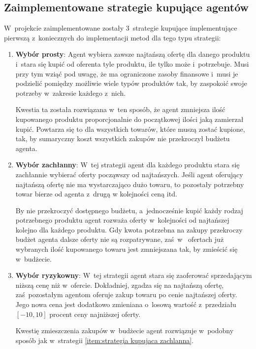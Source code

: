 \documentclass[12pt]{article}
\makeatletter
\def\namedlabel#1#2{\begingroup
   \def\@currentlabel{#2}%
   \label{#1}\endgroup
}
\makeatother
\begin{document}
\subsection{Zaimplementowane strategie kupujące agentów}
W~projekcie zaimplementowane zostały 3~strategie kupujące implementujące pierwszą z~koniecznych do implementacji metod dla tego typu strategii:
\begin{enumerate}
 \item \namedlabel{item:strategia kupujaca prosta}{Wybór prosty} \textbf{Wybór prosty}: Agent wybiera zawsze najtańszą ofertę dla danego produktu i~stara się kupić od oferenta tyle produktu, ile tylko może i~potrzebuje.
Musi przy tym wziąć pod uwagę, że ma ograniczone zasoby finansowe i~musi je podzielić pomiędzy możliwie wiele typów produktów tak, by zaspokoić swoje potrzeby w~zakresie każdego z~nich.

Kwestia ta została rozwiązana w~ten sposób, że agent zmniejsza ilość kupowanego produktu proporcjonalnie do początkowej ilości jaką zamierzał kupić.
Powtarza się to dla wszystkich towarów, które muszą zostać kupione, tak, by sumaryczny koszt wszystkich zakupów nie przekroczył budżetu agenta.
 \item \namedlabel{item:strategia kupujaca zachlanna}{Wybór zachłanny} \textbf{Wybór zachłanny}: W~tej strategii agent dla każdego produktu stara się zachłannie wybierać oferty począwszy od najtańszych. 
Jeśli agent oferujący najtańszą ofertę nie ma wystarczająco dużo towaru, to pozostały potrzebny towar bierze od agenta z~drugą w kolejności ceną itd.

By nie przekroczyć dostępnego budżetu, a~jednocześnie kupić każdy rodzaj potrzebnego produktu agent rozważa oferty w~kolejności od najtańszej kolejno dla każdego produktu. Gdy kwota potrzebna na zakupy
przekroczy budżet agenta dalsze oferty nie są rozpatrywane, zaś~w~ ofertach już wybranych ilość kupowanego towaru jest zmniejszana tak, by zmieścić się w~budżecie.
 
 \item \namedlabel{item:strategia kupujaca ryzykowna}{Wybór ryzykowny} \textbf{Wybór ryzykowny}: W~tej strategii agent stara się zaoferować sprzedającym niższą cenę niż w~ofercie. Dokładniej, zgadza się na najtańszą ofertę, zaś~pozostałym agentom
oferuje zakup towaru po cenie najtańszej oferty. Jego nowa cena jest dodatkowo zmieniana o~losową wartość z~przedziału $[-10, 10]$ procent ceny najniższej oferty.

Kwestię zmieszczenia zakupów w~budżecie agent rozwiązuje w~podobny sposób jak w~strategii \ref{item:strategia kupujaca zachlanna}.
\end{enumerate}
\end{document}

